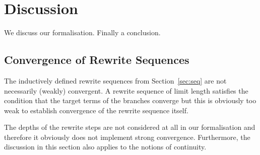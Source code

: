 \chapter{Discussion}\label{chap:discussion}

We discuss our formalisation. Finally a conclusion.


\section{Convergence of Rewrite Sequences}\label{sec:convergence}

The inductively defined rewrite sequences from Section~\ref{sec:seq}
are not necessarily (weakly) convergent. A rewrite sequence of limit
length satisfies the condition that the target terms of the
 branches converge but
this is obviously too weak to establish convergence of the rewrite
sequence itself.

The depths of the rewrite steps are not considered at all in our
formalisation and therefore it obviously does not implement strong
convergence. Furthermore, the discussion in this section also applies
to the notions of continuity.

